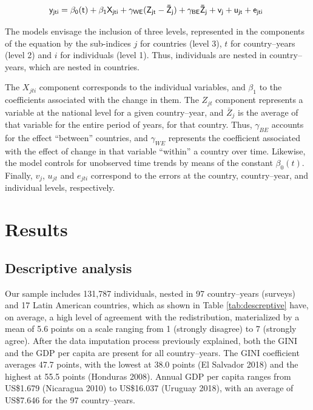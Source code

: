 \documentclass[utf8]{frontiersSCNS} %
\begin{document}
\begin{equation}
\small\sf\centering
y_{jti} = \beta_{0}(t) + \beta_1X_{jti} + \gamma_{WE}(Z_{jt} - \bar{Z}_{j}) + \gamma_{BE}\bar{Z}_{j} + v_{j} + u_{jt} + e_{jti} \
\label{eq:formula}
\end{equation}

The models envisage the inclusion of three levels, represented in the components of the equation by the sub-indices $j$ for countries (level 3), $t$ for country–years (level 2) and $i$ for individuals (level 1). Thus, individuals are nested in country–years, which are nested in countries.

The $X_{jti}$ component corresponds to the individual variables, and $\beta_1$ to the coefficients associated with the change in them. The $Z_{jt}$ component represents a variable at the national level for a given country–year, and $\bar{Z}_{j}$ is the average of that variable for the entire period of years, for that country. Thus, $\gamma_{BE}$ accounts for the effect “between” countries, and $\gamma_{WE}$ represents the coefficient associated with the effect of change in that variable “within” a country over time. Likewise, the model controls for unobserved time trends by means of the constant $\beta_{0}(t)$. Finally, $v_{j}$,  $u_{jt}$ and $e_{jti}$ correspond to the errors at the country, country–year, and individual levels, respectively.

\section{Results}

\subsection{Descriptive analysis}

Our sample includes 131,787 individuals, nested in 97 country–years (surveys) and 17 Latin American countries, which as shown in Table \ref{tab:descreptive} have, on average, a high level of agreement with the redistribution, materialized by a mean of 5.6 points on a scale ranging from 1 (strongly disagree) to 7 (strongly agree). After the data imputation process previously explained, both the GINI and the GDP per capita are present for all country–years. The GINI coefficient averages 47.7 points, with the lowest at 38.0 points (El Salvador 2018) and the highest at 55.5 points (Honduras 2008). Annual GDP per capita ranges from US\$1.679 (Nicaragua 2010) to US\$16.037 (Uruguay 2018), with an average of US\$7.646 for the 97 country–years.
\end{document}
